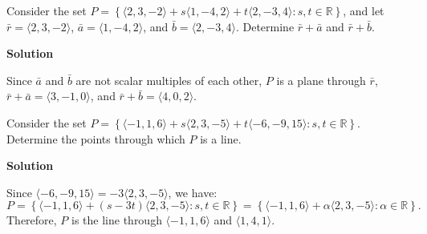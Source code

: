 \begin{examplebox}
Consider the set \( P = \left\{ \langle 2, 3, -2 \rangle + s\langle 1, -4, 2 \rangle + t\langle 2, -3, 4 \rangle : s, t \in \mathbb{R} \right\} \), and
let \( \bar{r} = \langle 2, 3, -2 \rangle \), \( \bar{a} = \langle 1, -4, 2 \rangle \), and \( \bar{b} = \langle 2, -3, 4 \rangle \). Determine \( \bar{r} + \bar{a} \) and \( \bar{r} + \bar{b} \).

\vspace{0.5em}

\textbf{Solution}

\vspace{0.5em}

Since \( \bar{a} \) and \( \bar{b} \) are not scalar multiples
of each other, \( P \) is a plane through \( \bar{r} \), \( \bar{r} + \bar{a} = \langle 3, -1, 0 \rangle \), and \( \bar{r} + \bar{b} = \langle 4, 0, 2 \rangle \).
\end{examplebox}

\begin{examplebox}
Consider the set \( P = \left\{ \langle -1, 1, 6 \rangle + s\langle 2, 3, -5 \rangle + t\langle -6, -9, 15 \rangle : s, t \in \mathbb{R} \right\} \). Determine the points through which \( P \) is a line.

\vspace{0.5em}

\textbf{Solution}

\vspace{0.5em}

Since \( \langle -6, -9, 15 \rangle = -3\langle 2, 3, -5 \rangle \), we have:
\[
P = \left\{ \langle -1, 1, 6 \rangle + (s - 3t)\langle 2, 3, -5 \rangle : s, t \in \mathbb{R} \right\}
= \left\{ \langle -1, 1, 6 \rangle + \alpha\langle 2, 3, -5 \rangle : \alpha \in \mathbb{R} \right\}.
\]
Therefore, \( P \) is the line through \( \langle -1, 1, 6 \rangle \) and \( \langle 1, 4, 1 \rangle \).
\end{examplebox}

